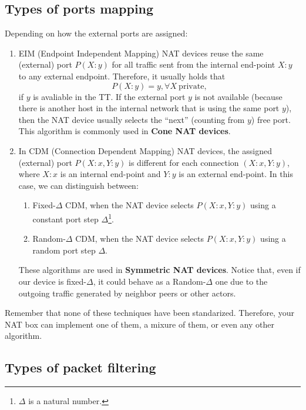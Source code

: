 \subsection{Types of ports mapping}

Depending on how the external ports are assigned:

\begin{enumerate}
\item EIM (Endpoint Independent Mapping) NAT devices reuse the same
  (external) port $P(X:y)$ for all traffic sent from the internal
  end-point $X:y$ to any external endpoint. Therefore, it usually
  holds that
  \begin{equation}
    P(X:y)=y, \forall X~\mathrm{private},
  \end{equation}
  if $y$ is avaliable in the TT. If the external port $y$ is not
  available (because there is another host in the internal network
  that is using the same port $y$), then the NAT device usually
  selects the ``next'' (counting from $y$) free port. This algorithm
  is commonly used in \textbf{Cone NAT devices}.
\item In CDM (Connection Dependent Mapping) NAT devices, the assigned
  (external) port $P(X:x,Y:y)$ is different for each connection
  $(X:x,Y:y)$, where $X:x$ is an internal end-point and $Y:y$ is an
  external end-point. In this case, we can distinguish between:
  \begin{enumerate}
  \item Fixed-$\Delta$ CDM, when the NAT device selects $P(X:x,Y:y)$
    using a constant port step $\Delta$\footnote{$\Delta$ is a natural
      number.}.
  \item Random-$\Delta$ CDM, when the NAT device selects $P(X:x,Y:y)$
      using a random port step $\Delta$.
  \end{enumerate}
  These algorithms are used in \textbf{Symmetric NAT devices}. Notice
  that, even if our device is fixed-$\Delta$, it could behave as a
  Random-$\Delta$ one due to the outgoing traffic generated by
  neighbor peers or other actors.
\end{enumerate}

Remember that none of these techniques have been
standarized. Therefore, your NAT box can implement one of them, a
mixure of them, or even any other algorithm.

\subsection{Types of packet filtering}

